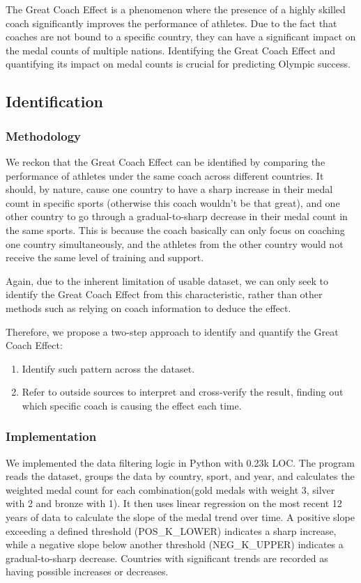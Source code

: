 \documentclass{mcmthesis}
\begin{document}
The Great Coach Effect is a phenomenon where the presence of a highly skilled coach significantly improves the performance of athletes. Due to the fact that coaches are not bound to a specific country, they can have a significant impact on the medal counts of multiple nations. Identifying the Great Coach Effect and quantifying its impact on medal counts is crucial for predicting Olympic success.

\subsection{Identification}

\subsubsection{Methodology}

We reckon that the Great Coach Effect can be identified by comparing the performance of athletes under the same coach across different countries. It should, by nature, cause one country to have a sharp increase in their medal count in specific sports (otherwise this coach wouldn't be that great), and one other country to go through a gradual-to-sharp decrease in their medal count in the same sports. This is because the coach basically can only focus on coaching one country simultaneously, and the athletes from the other country would not receive the same level of training and support.

Again, due to the inherent limitation of usable dataset, we can only seek to identify the Great Coach Effect from this characteristic, rather than other methods such as relying on coach information to deduce the effect.

Therefore, we propose a two-step approach to identify and quantify the Great Coach Effect:

\begin{enumerate}
    \item Identify such pattern across the dataset.
    \item Refer to outside sources to interpret and cross-verify the result, finding out which specific coach is causing the effect each time.
\end{enumerate}

\subsubsection{Implementation}

We implemented the data filtering logic in Python with 0.23k LOC. The program reads the dataset, groups the data by country, sport, and year, and calculates the weighted medal count for each combination(gold medals with weight 3, silver with 2 and bronze with 1). It then uses linear regression on the most recent 12 years of data to calculate the slope of the medal trend over time. A positive slope exceeding a defined threshold (POS\_K\_LOWER) indicates a sharp increase, while a negative slope below another threshold (NEG\_K\_UPPER) indicates a gradual-to-sharp decrease. Countries with significant trends are recorded as having possible increases or decreases.
\end{document}
